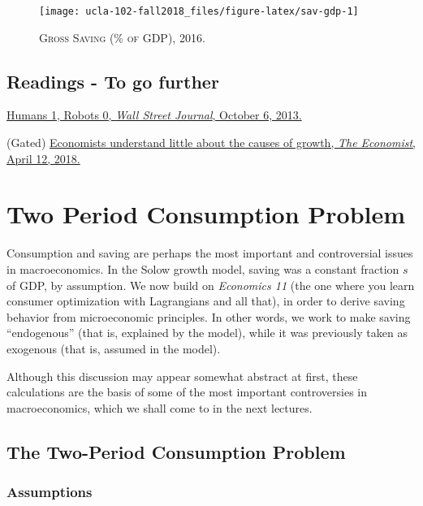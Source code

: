 \documentclass[]{book}
\theoremstyle{definition}
\theoremstyle{definition}
\theoremstyle{definition}
\theoremstyle{remark}
\begin{document}
\begin{figure}

{\centering \texttt{[image: ucla-102-fall2018\_files/figure-latex/sav-gdp-1]} 

}

\caption{\textsc{Gross Saving (\% of GDP), 2016}.}\label{fig:sav-gdp}
\end{figure}

\section*{Readings - To go further}\label{readings---to-go-further-1}

\href{https://www.wsj.com/articles/humans-1-robots-0-1381098947?tesla=y}{Humans
1, Robots 0, \emph{Wall Street Journal}, October 6, 2013.}

(Gated)
\href{https://www.economist.com/finance-and-economics/2018/04/12/economists-understand-little-about-the-causes-of-growth}{Economists
understand little about the causes of growth, \emph{The Economist},
April 12, 2018.}

\hypertarget{two-period}{\chapter{Two Period Consumption
Problem}\label{two-period}}

Consumption and saving are perhaps the most important and controversial
issues in macroeconomics. In the Solow growth model, saving was a
constant fraction \(s\) of GDP, by assumption. We now build on
\emph{Economics 11} (the one where you learn consumer optimization with
Lagrangians and all that), in order to derive saving behavior from
microeconomic principles. In other words, we work to make saving
``endogenous'' (that is, explained by the model), while it was
previously taken as exogenous (that is, assumed in the model).

Although this discussion may appear somewhat abstract at first, these
calculations are the basis of some of the most important controversies
in macroeconomics, which we shall come to in the next lectures.

\section{The Two-Period Consumption
Problem}\label{the-two-period-consumption-problem}

\subsection{Assumptions}\label{assumptions-1}
\end{document}
